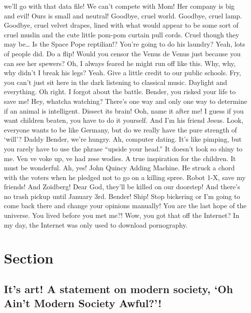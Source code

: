 \documentclass[]{report}
\begin{document}
we'll go with that data file! We can't compete with Mom! Her company is
big and evil! Ours is small and neutral! Goodbye, cruel world. Goodbye,
cruel lamp. Goodbye, cruel velvet drapes, lined with what would appear
to be some sort of cruel muslin and the cute little pom-pom curtain pull
cords. Cruel though they may be\ldots{} Is the Space Pope reptilian!?
You're going to do his laundry? Yeah, lots of people did. Do a flip!
Would you censor the Venus de Venus just because you can see her
spewers? Oh, I always feared he might run off like this. Why, why, why
didn't I break his legs? Yeah. Give a little credit to our public
schools. Fry, you can't just sit here in the dark listening to classical
music. Daylight and everything. Oh right. I forgot about the battle.
Bender, you risked your life to save me! Hey, whatcha watching? There's
one way and only one way to determine if an animal is intelligent.
Dissect its brain! Ooh, name it after me! I guess if you want children
beaten, you have to do it yourself. And I'm his friend Jesus. Look,
everyone wants to be like Germany, but do we really have the pure
strength of `will'? Daddy Bender, we're hungry. Ah, computer dating.
It's like pimping, but you rarely have to use the phrase ``upside your
head.'' It doesn't look so shiny to me. Ven ve voke up, ve had zese
wodies. A true inspiration for the children. It must be wonderful. Ah,
yes! John Quincy Adding Machine. He struck a chord with the voters when
he pledged not to go on a killing spree. Robot 1-X, save my friends! And
Zoidberg! Dear God, they'll be killed on our doorstep! And there's no
trash pickup until January 3rd. Bender! Ship! Stop bickering or I'm
going to come back there and change your opinions manually! You are the
last hope of the universe. You lived before you met me?! Wow, you got
that off the Internet? In my day, the Internet was only used to download
pornography.

\label{chapter-3}

\section{Section}\label{section-3.1}

\subsection{\texorpdfstring{It's art! A statement on modern society, `Oh
Ain't Modern Society
Awful?'!}{It's art! A statement on modern society, Oh Ain't Modern Society Awful?!}}\label{its-art-a-statement-on-modern-society-oh-aint-modern-society-awful}
\end{document}
